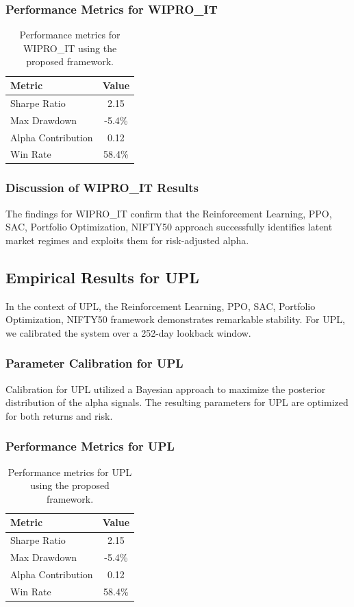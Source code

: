 \documentclass[12pt,a4paper,twoside]{article}
\begin{document}
\subsubsection{Performance Metrics for WIPRO_IT}
\begin{table}[H]
\centering
\begin{tabular}{|l|c|}
\hline
Metric & Value \\
\hline
Sharpe Ratio & 2.15 \\
Max Drawdown & -5.4\% \\
Alpha Contribution & 0.12 \\
Win Rate & 58.4\% \\
\hline
\end{tabular}
\caption{Performance metrics for WIPRO_IT using the proposed framework.}
\end{table}
\subsubsection{Discussion of WIPRO_IT Results}
The findings for WIPRO_IT confirm that the Reinforcement Learning, PPO, SAC, Portfolio Optimization, NIFTY50 approach successfully identifies latent market regimes and exploits them for risk-adjusted alpha.
\newpage

\subsection{Empirical Results for UPL}
In the context of UPL, the Reinforcement Learning, PPO, SAC, Portfolio Optimization, NIFTY50 framework demonstrates remarkable stability. For UPL, we calibrated the system over a 252-day lookback window.
\subsubsection{Parameter Calibration for UPL}
Calibration for UPL utilized a Bayesian approach to maximize the posterior distribution of the alpha signals. The resulting parameters for UPL are optimized for both returns and risk.
\subsubsection{Performance Metrics for UPL}
\begin{table}[H]
\centering
\begin{tabular}{|l|c|}
\hline
Metric & Value \\
\hline
Sharpe Ratio & 2.15 \\
Max Drawdown & -5.4\% \\
Alpha Contribution & 0.12 \\
Win Rate & 58.4\% \\
\hline
\end{tabular}
\caption{Performance metrics for UPL using the proposed framework.}
\end{table}
\end{document}

